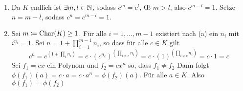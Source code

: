 \documentclass[sectionformat = aufgabe]{gadsescript}
\begin{document}
\subsection{}
\begin{enumerate}[label=(\alph*)]
	\item Da $ K $ endlich ist $ \exists m, l \in \mathbb{N}  $, sodass $ c^{m} = c^{l} $, \OE{} $ m > l $, also $ c^{m - l} = 1 $. Setze $ n = m - l $, sodass $ c^n = c ^{m - l} = 1 $.
	\item Sei $ m \coloneqq \operatorname{Char}(K) \geq 1 $. Für alle $ i = 1,  \dotsc, m - 1 $ existiert nach (a) ein $ n_i $ mit $ i^{n_i} = 1 $. Sei $ n = 1 + \prod_{i = 1} ^{m - 1} n_i $, so dass für alle $ c \in K $ gilt
		\[
			c^{n} = c^{\left(1 + \prod_{i} n_i\right)} = c \cdot \left( c^{n_c}  \right) ^{\left(\prod_{i \neq c} n_i\right)} = c \cdot \left( 1 \right) ^{\left(\prod_{i \neq c} n_i\right)} = c \cdot 1 = c
		\]
		Sei $ f_1 = c x $ ein Polynom und $ f_2 = cx^{n} $ so, dass $ f_1 \neq f_2 $
		Dann folgt $ \phi(f_1)(a) = c \cdot a = c \cdot a^n = \phi(f_2)(a) $. Für alle $ a \in K $. Also $ \phi(f_1) = \phi(f_2) $
\end{enumerate}
\end{document}
